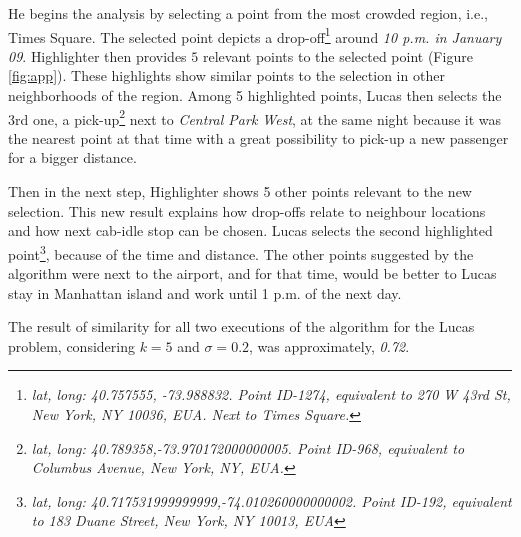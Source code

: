 He begins the analysis by selecting a point from the most crowded region, i.e., Times Square. The selected point depicts a drop-off\footnote{\textit{lat, long: 40.757555, -73.988832. Point ID-1274, equivalent to 270 W 43rd St, New York, NY 10036, EUA. Next to Times Square.}} around \textit{10 p.m. in January 09}.  {\sc Highlighter} then provides $5$ relevant points to the selected point (Figure \ref{fig:app}). These highlights show similar points to the selection in other neighborhoods of the region. Among 5 highlighted points, Lucas then selects the 3rd one, a pick-up\footnote{\textit{lat, long: 40.789358,-73.970172000000005. Point ID-968, equivalent to Columbus Avenue, New York, NY, EUA.}} next to \textit{ Central Park West},  at the same night because it was the nearest point at that time with a great possibility to pick-up a new passenger for a bigger distance. 

Then in the next step, {\sc Highlighter} shows 5 other points relevant to the new selection. This new result explains how drop-offs relate to neighbour locations and how next cab-idle stop can be chosen. Lucas selects the second highlighted point\footnote{\textit{lat, long: 40.717531999999999,-74.010260000000002. Point ID-192, equivalent to 183 Duane Street, New York, NY 10013, EUA}}, because of the time and distance. The other points suggested by the algorithm were next to the airport, and for that time, would be better to Lucas stay in Manhattan island and work until 1 p.m. of the next day. 

The result of similarity for all two executions of the algorithm for the Lucas problem, considering $k = 5$ and $\sigma = 0.2$, was approximately, \textit{0.72}.